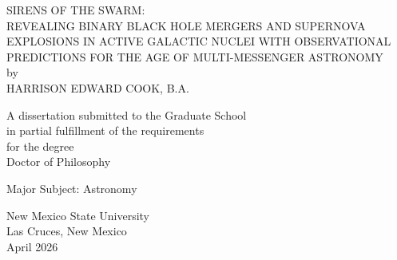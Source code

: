 \begin{center}
SIRENS OF THE SWARM:\\
REVEALING BINARY BLACK HOLE MERGERS AND SUPERNOVA EXPLOSIONS IN ACTIVE GALACTIC NUCLEI WITH OBSERVATIONAL PREDICTIONS FOR THE AGE OF MULTI-MESSENGER ASTRONOMY \\
\medskip
by\\
\medskip
HARRISON EDWARD COOK, B.A.
\end{center}
\vspace{0.65in}
\begin{center}
A dissertation submitted to the Graduate School\\
\smallskip
in partial fulfillment of the requirements\\
\smallskip
for the degree\\
\smallskip
Doctor of Philosophy
\end{center}
\vspace{0.5in}
\begin{center}
Major Subject: Astronomy
\end{center}
\vspace{0.5in}
\begin{center}
New Mexico State University\\
\smallskip
Las Cruces, New Mexico\\
\smallskip
April 2026 %
\end{center}

